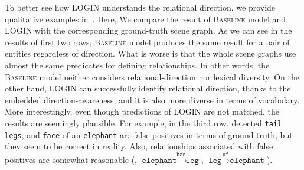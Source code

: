         To better see how LOGIN understands the relational direction, we provide qualitative examples in~.
        Here, We compare the result of \textsc{Baseline} model and \textsc{LOGIN} with the corresponding ground-truth scene graph.
        As we can see in the results of first two rows, \textsc{Baseline} model produces the same result for a pair of entities regardless of direction. What is worse is that the whole scene graphs use almost the same predicates for defining relationships. In other words, the \textsc{Baseline} model neither considers relational-direction nor lexical diversity.
        On the other hand, LOGIN can successfully identify relational direction, thanks to the embedded direction-awareness, and it is also more diverse in terms of vocabulary.
        More interestingly, even though predictions of LOGIN are not matched, the results are seemingly plausible. For example, in the third row, detected \texttt{tail}, \texttt{legs}, and \texttt{face} of an \texttt{elephant} are false positives in terms of ground-truth, but they seem to be correct in reality. Also, relationships associated with false positives are somewhat reasonable (\eg, $\texttt{elephant} \xrightarrow{\texttt{has}} \texttt{leg}$, $\texttt{leg} \xrightarrow{\texttt{of}} \texttt{elephant}$).
        